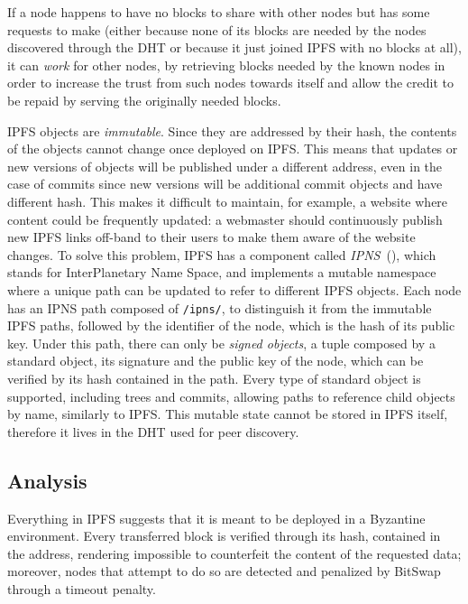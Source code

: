 \documentclass[mscthesis]{usiinfthesis}
\begin{document}
If a node happens to have no blocks to share with other nodes but has some requests to make (either because none of its blocks are needed by the nodes discovered through the DHT or because it just joined IPFS with no blocks at all), it can \textit{work} for other nodes, by retrieving blocks needed by the known nodes in order to increase the trust from such nodes towards itself and allow the credit to be repaid by serving the originally needed blocks.

IPFS objects are \emph{immutable}. Since they are addressed by their hash, the contents of the objects cannot change once deployed on IPFS. This means that updates or new versions of objects will be published under a different address, even in the case of commits since new versions will be additional commit objects and have different hash. This makes it difficult to maintain, for example, a website where content could be frequently updated: a webmaster should continuously publish new IPFS links off-band to their users to make them aware of the website changes. To solve this problem, IPFS has a component called \emph{IPNS}~(\cite{benet2014ipfs}), which stands for InterPlanetary Name Space, and implements a mutable namespace where a unique path can be updated to refer to different IPFS objects. Each node has an IPNS path composed of \texttt{/ipns/}, to distinguish it from the immutable IPFS paths, followed by the identifier of the node, which is the hash of its public key. Under this path, there can only be \textit{signed objects}, a tuple composed by a standard object, its signature and the public key of the node, which can be verified by its hash contained in the path. Every type of standard object is supported, including trees and commits, allowing paths to reference child objects by name, similarly to IPFS. This mutable state cannot be stored in IPFS itself, therefore it lives in the DHT used for peer discovery.

\subsection{Analysis}\label{sec:ipfsanalysis}

Everything in IPFS suggests that it is meant to be deployed in a Byzantine environment. Every transferred block is verified through its hash, contained in the address, rendering impossible to counterfeit the content of the requested data; moreover, nodes that attempt to do so are detected and penalized by BitSwap through a timeout penalty.
\end{document}
